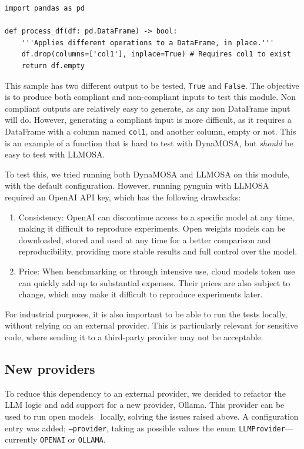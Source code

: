 \documentclass{article}
\newenvironment{code}{\captionsetup{type=listing}}{}
\begin{document}
\begin{code}
\caption{Module under test (MUT)}\label{lst:tab}
\begin{verbatim}
import pandas as pd

def process_df(df: pd.DataFrame) -> bool:
    '''Applies different operations to a DataFrame, in place.'''
    df.drop(columns=['col1'], inplace=True) # Requires col1 to exist
    return df.empty
\end{verbatim}
\end{code}

This sample has two different output to be tested, \texttt{True} and \texttt{False}.
The objective is to produce both compliant and non-compliant inputs to test this module. Non compliant outputs are relatively easy to generate, as any non DataFrame input will do. However, generating a compliant input is more difficult, as it requires a DataFrame with a column named \texttt{col1}, and another column, empty or not. This is an example of a function that is hard to test with DynaMOSA, but \emph{should} be easy to test with LLMOSA.

To test this, we tried running both DynaMOSA and LLMOSA on this module, with the default configuration.
However, running pynguin with LLMOSA required an OpenAI API key, which has the following drawbacks:

\begin{enumerate}
    \item Consistency: OpenAI can discontinue access to a specific model at any time, making it difficult to reproduce experiments. Open weights models can be downloaded, stored and used at any time for a better comparison and reproducibility, providing more stable results and full control over the model.
    \item Price: When benchmarking or through intensive use, cloud models token use can quickly add up to substantial expenses. Their prices are also subject to change, which may make it difficult to reproduce experiments later.
\end{enumerate}

For industrial purposes, it is also important to be able to run the tests locally, without relying on an external provider. This is particularly relevant for sensitive code, where sending it to a third-party provider may not be acceptable.

\subsection{New providers}
To reduce this dependency to an external provider, we decided to refactor the LLM logic and add support for a new provider, Ollama. This provider can be used to run open models~\cite{Ollama} locally, solving the issues raised above.
A configuration entry was added; \texttt{--provider}, taking as possible values the enum \texttt{LLMProvider}---currently \texttt{OPENAI} or \texttt{OLLAMA}.
\end{document}
